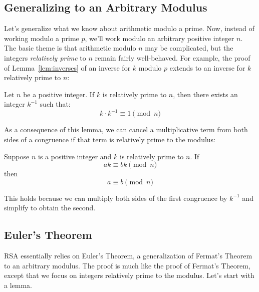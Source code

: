 \subsection{Generalizing to an Arbitrary Modulus}

Let's generalize what we know about arithmetic modulo a prime.  Now,
instead of working modulo a prime $p$, we'll work modulo an arbitrary
positive integer $n$.  The basic theme is that arithmetic modulo $n$ may
be complicated, but the integers {\em relatively prime} to $n$ remain
fairly well-behaved.  For example, the proof of Lemma~\ref{lem:inverses}
of an inverse for $k$ modulo $p$ extends to an inverse for $k$ relatively
prime to $n$:

\begin{lemma}
\label{lem:inverse-arb}
Let $n$ be a positive integer.  If $k$ is relatively prime to $n$,
then there exists an integer $k^{-1}$ such that:
%
\[
k \cdot k^{-1} \equiv 1 \pmod{n}
\]
\end{lemma}

As a consequence of this lemma, we can cancel a multiplicative term
from both sides of a congruence if that term is relatively prime to
the modulus:

\begin{corollary}
\label{cor:cancellation-arb}
Suppose $n$ is a positive integer and $k$ is relatively prime to $n$.
If
%
\[
a k \equiv b k \pmod{n}
\]
%
then
%
\[
a \equiv b \pmod{n}
\]
\end{corollary}

This holds because we can multiply both sides of the first congruence
by $k^{-1}$ and simplify to obtain the second.

\subsection{Euler's Theorem}

RSA essentially relies on Euler's Theorem, a generalization of
Fermat's Theorem to an arbitrary modulus.  The proof is much like the
proof of Fermat's Theorem, except that we focus on integers relatively
prime to the modulus.  Let's start with a lemma.


